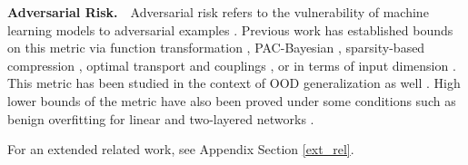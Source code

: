 


\textbf{Adversarial Risk.}\ \ Adversarial risk refers to the vulnerability of machine learning models to adversarial examples \cite{pmlr-v80-uesato18a, pmlr-v89-suggala19a}. Previous work has established bounds on this metric via function transformation \cite{khim2019adversarial}, PAC-Bayesian \cite{pmlr-v238-mustafa24a}, sparsity-based compression \cite{balda2019adversarial}, optimal transport and couplings \cite{pmlr-v119-pydi20a}, or in terms of input dimension \cite{simon2019first}. This metric has been studied in the context of OOD generalization as well \cite{zou2024adversarial, fort2022adversarial, augustin2020adversarial}. High lower bounds of the metric have also been proved under some conditions such as benign overfitting for linear and two-layered networks \cite{hao2024surprising}.

For an extended related work, see Appendix Section \ref{ext_rel}.

 










